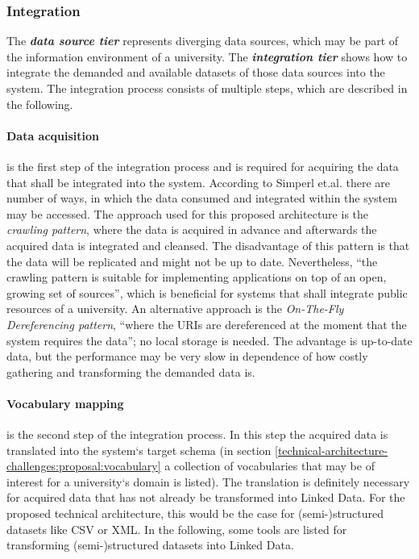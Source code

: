 \documentclass{article}
\begin{document}
\subsubsection{Integration}
\label{technical-architecture-challenges:proposal:integration}
The \textit{\textbf{data source tier}} represents diverging data sources, which may be part of the information environment of a university. The \textit{\textbf{integration tier}} shows how to integrate the demanded and available datasets of those data sources into the system. The integration process consists of multiple steps, which are described in the following.

\paragraph{Data acquisition} is the first step of the integration process and is required for acquiring the data that shall be integrated into the system. According to Simperl et.al.\cite{simperl_using_2013}\cite{heath_linked_2011} there are number of ways, in which the data consumed and integrated within the system may be accessed. The approach used for this proposed architecture is the \textit{crawling pattern}, where the data is acquired in advance and afterwards the acquired data is integrated and cleansed. The disadvantage of this pattern is that the data will be replicated and might not be up to date. Nevertheless, \enquote{the crawling pattern is suitable for implementing applications on top of an open, growing set of sources}\cite{heath_linked_2011}, which is beneficial for systems that shall integrate public resources of a university. An alternative approach is the \textit{On-The-Fly Dereferencing pattern}, \enquote{where the URIs are dereferenced at the moment that the system requires the data}; no local storage is needed. The advantage is up-to-date data, but the performance may be very slow in dependence of how costly gathering and transforming the demanded data is.





\paragraph{Vocabulary mapping} is the second step of the integration process. In this step the acquired data is translated into the system`s target schema (in section \ref{technical-architecture-challenges:proposal:vocabulary} a collection of vocabularies that may be of interest for a university`s domain is listed). The translation is definitely necessary for acquired data that has not already be transformed into Linked Data. For the proposed technical architecture, this would be the case for (semi-)structured datasets like CSV or XML. In the following, some tools are listed for transforming (semi-)structured datasets into Linked Data.
\end{document}
